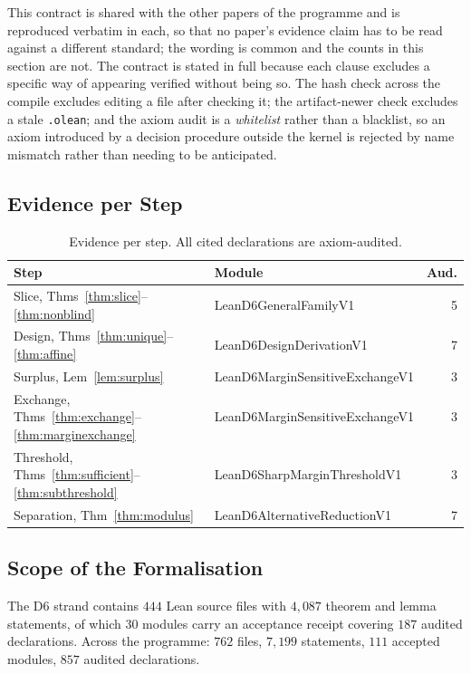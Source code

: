 \documentclass[conference]{IEEEtran}
\theoremstyle{definition}
\newcommand{\lean}[1]{\textsf{\footnotesize #1}}
\begin{document}
This contract is shared with the other papers of the programme and is reproduced verbatim in
each, so that no paper's evidence claim has to be read against a different standard; the
wording is common and the counts in this section are not. The contract is stated in full
because each clause excludes a specific way of appearing verified without being so. The hash check across the compile excludes editing a file after
checking it; the artifact-newer check excludes a stale \texttt{.olean}; and the axiom audit is
a \emph{whitelist} rather than a blacklist, so an axiom introduced by a decision procedure
outside the kernel is rejected by name mismatch rather than needing to be anticipated.

\subsection{Evidence per Step}

\begin{table}[htbp]
\caption{Evidence per step. All cited declarations are axiom-audited.}
\label{tab:inventory}
\centering\footnotesize\setlength{\tabcolsep}{3pt}
\begin{tabular}{@{}llr@{}}
\toprule
Step & Module & Aud. \\
\midrule
Slice, Thms~\ref{thm:slice}--\ref{thm:nonblind} & \lean{LeanD6GeneralFamilyV1}       & 5 \\
Design, Thms~\ref{thm:unique}--\ref{thm:affine} & \lean{LeanD6DesignDerivationV1}    & 7 \\
Surplus, Lem~\ref{lem:surplus}                  & \lean{LeanD6MarginSensitiveExchangeV1} & 3 \\
Exchange, Thms~\ref{thm:exchange}--\ref{thm:marginexchange} & \lean{LeanD6MarginSensitiveExchangeV1} & 3 \\
Threshold, Thms~\ref{thm:sufficient}--\ref{thm:subthreshold} & \lean{LeanD6SharpMarginThresholdV1} & 3 \\
Separation, Thm~\ref{thm:modulus}               & \lean{LeanD6AlternativeReductionV1} & 7 \\
\bottomrule
\end{tabular}
\end{table}

\subsection{Scope of the Formalisation}

The D6 strand contains $444$ Lean source files with $4{,}087$ theorem and lemma statements,
of which $30$ modules carry an acceptance receipt covering $187$ audited declarations. Across
the programme: $762$ files, $7{,}199$ statements, $111$ accepted modules, $857$ audited
declarations.
\end{document}
